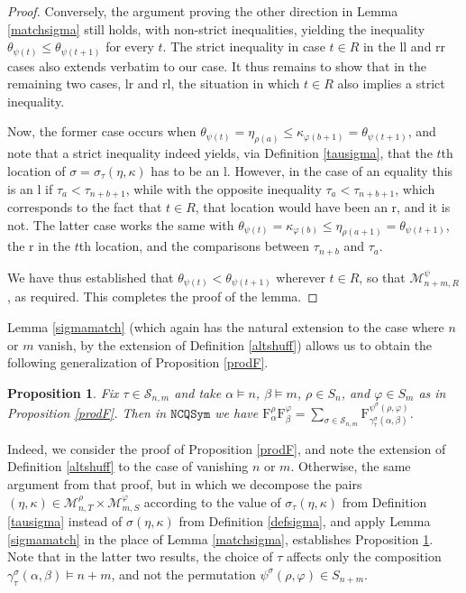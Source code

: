 \documentclass{article}
\newtheorem{prop}[thm]{Proposition}
\theoremstyle{definition}
\begin{document}
\begin{proof}
Conversely, the argument proving the other direction in Lemma \ref{matchsigma} still holds, with non-strict inequalities, yielding the inequality $\theta_{\psi(t)}\leq\theta_{\psi(t+1)}$ for every $t$. The strict inequality in case $t \in R$ in the ll and rr cases also extends verbatim to our case. It thus remains to show that in the remaining two cases, lr and rl, the situation in which $t \in R$ also implies a strict inequality.

Now, the former case occurs when $\theta_{\psi(t)}=\eta_{\rho(a)}\leq\kappa_{\varphi(b+1)}=\theta_{\psi(t+1)}$, and note that a strict inequality indeed yields, via Definition \ref{tausigma}, that the $t$th location of $\sigma=\sigma_{\tau}(\eta,\kappa)$ has to be an l. However, in the case of an equality this is an l if $\tau_{a}<\tau_{n+b+1}$, while with the opposite inequality $\tau_{a}<\tau_{n+b+1}$, which corresponds to the fact that $t \in R$, that location would have been an r, and it is not. The latter case works the same with $\theta_{\psi(t)}=\kappa_{\varphi(b)}\leq\eta_{\rho(a+1)}=\theta_{\psi(t+1)}$, the r in the $t$th location, and the comparisons between $\tau_{n+b}$ and $\tau_{a}$.

We have thus established that $\theta_{\psi(t)}<\theta_{\psi(t+1)}$ wherever $t \in R$, so that $\mathcal{M}_{n+m,R}^{\psi}$, as required. This completes the proof of the lemma.
\end{proof}

\medskip

Lemma \ref{sigmamatch} (which again has the natural extension to the case where $n$ or $m$ vanish, by the extension of Definition \ref{altshuff}) allows us to obtain the following generalization of Proposition \ref{prodF}.
\begin{prop}
Fix $\tau\in\mathcal{S}_{n,m}$ and take $\alpha \vDash n$, $\beta \vDash m$, $\rho \in S_{n}$, and $\varphi \in S_{m}$ as in Proposition \ref{prodF}. Then in $\mathtt{NCQSym}$ we have $\mathrm{F}_{\alpha}^{\rho}\mathrm{F}_{\beta}^{\varphi}=\sum_{\sigma\in\mathcal{S}_{n,m}}\mathrm{F}_{\gamma^{\sigma}_{\tau}(\alpha,\beta)}^{\psi^{\sigma}(\rho,\varphi)}$. \label{prodFtau}
\end{prop}
Indeed, we consider the proof of Proposition \ref{prodF}, and note the extension of Definition \ref{altshuff} to the case of vanishing $n$ or $m$. Otherwise, the same argument from that proof, but in which we decompose the pairs $(\eta,\kappa)\in\mathcal{M}_{n,T}^{\rho}\times\mathcal{M}_{m,S}^{\varphi}$ according to the value of $\sigma_{\tau}(\eta,\kappa)$ from Definition \ref{tausigma} instead of $\sigma(\eta,\kappa)$ from Definition \ref{defsigma}, and apply Lemma \ref{sigmamatch} in the place of Lemma \ref{matchsigma}, establishes Proposition \ref{prodFtau}. Note that in the latter two results, the choice of $\tau$ affects only the composition $\gamma^{\sigma}_{\tau}(\alpha,\beta) \vDash n+m$, and not the permutation $\psi^{\sigma}(\rho,\varphi) \in S_{n+m}$.
\end{document}
